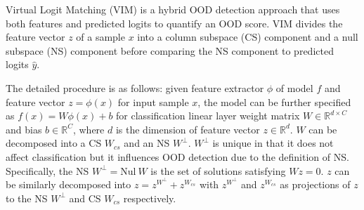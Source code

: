 Virtual Logit Matching (VIM) \cite{wang2022vim} is a hybrid OOD detection approach that uses both features and predicted logits to quantify an OOD score. VIM divides the feature vector $z$ of a sample $x$ into a column subspace (CS) component and a null subspace (NS) component before comparing the NS component to predicted logits $\hat{y}$.

The detailed procedure is as follows: given feature extractor $\phi$ of model $f$ and feature vector $z = \phi(x)$ for input sample $x$, the model can be further specified as $f(x) = W \phi(x) + b$ for classification linear layer weight matrix $W \in \mathbb{R}^{d \times C}$ and bias $b \in \mathbb{R}^{C}$, where $d$ is the dimension of feature vector $z \in \mathbb{R}^d$. $W$ can be decomposed into a CS $W_{cs}$ and an NS $W^{\perp}$. $W^{\perp}$ is unique in that it does not affect classification but it influences OOD detection due to the definition of NS. Specifically, the NS $W^{\perp} = \text{Nul}\ W$ is the set of solutions satisfying $W z = 0$. $z$ can be similarly decomposed into $z= z^{W^{\perp}} + z^{W_{cs}}$ with $z^{W^{\perp}}$ and $z^{W_{cs}}$ as projections of $z$ to the NS $W^{\perp}$ and CS $W_{cs}$ respectively.

